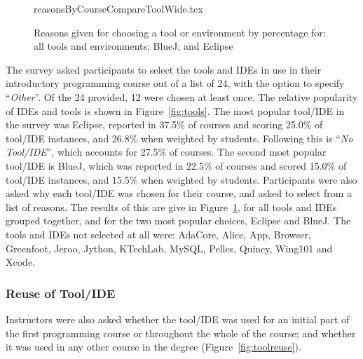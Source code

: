 \documentclass[english,submission]{programming}
\begin{document}

\begin{figure}
\begin{center}
{reasonsByCourseCompareToolWide.tex}
\end{center}
\caption{Reasons given for choosing a tool or environment by percentage for: all tools and environments; BlueJ; and Eclipse\label{fig:reasonsTools}}
\end{figure}

The survey asked participants to select the tools and IDEs in use in
their introductory programming course out of a list of 24, with the
option to specify ``{\emph{Other}}''. Of the 24 provided, 12 were
chosen at least once. The relative popularity of IDEs and tools is
shown in Figure~\ref{fig:tools}. The most popular tool/IDE in the
survey was Eclipse, reported in 37.5\% of courses and scoring 25.0\%
of tool/IDE instances, and 26.8\% when weighted by students. Following
this is ``{\emph{No Tool/IDE}}'', which accounts for 27.5\% of
courses. The second most popular tool/IDE is BlueJ, which was reported
in 22.5\% of courses and scored 15.0\% of tool/IDE instances, and
15.5\% when weighted by students. Participants were also asked why
each tool/IDE was chosen for their course, and asked to select from a
list of reasons. The results of this are give in
Figure~\ref{fig:reasonsTools}, for all tools and IDEs grouped
together, and for the two most popular choices, Eclipse and BlueJ. The
tools and IDEs not selected at all were: AdaCore, Alice, App, Browser,
Greenfoot, Jeroo, Jython, KTechLab, MySQL, Pelles, Quincy, Wing101 and
Xcode.

\subsubsection{Reuse of Tool/IDE}

Instructors were also asked whether the tool/IDE was used for an
initial part of the first programming course or throughout the whole
of the course; and whether it was used in any other course in the
degree (Figure~\ref{fig:toolreuse}). 
\end{document}

